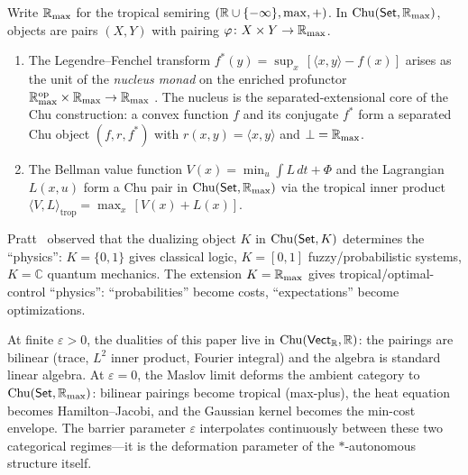 \begin{proposition}
\label{prop:tropical-chu}
Write $\mathbb{R}_{\max}$ for the tropical semiring
$(\mathbb{R} \cup \{-\infty\}, \max, +)$.
In $\mathrm{Chu}(\mathsf{Set}, \mathbb{R}_{\max})$, objects are pairs $(X, Y)$
with pairing $\varphi \colon X \times Y \to \mathbb{R}_{\max}$.
\begin{enumerate}[label=\textup{(\roman*)},nosep]
\item The Legendre--Fenchel transform
  $f^*(y) = \sup_x\, [\langle x, y \rangle - f(x)]$ arises as the
  unit of the \emph{nucleus monad} on the enriched profunctor
  $\mathbb{R}^{\operatorname{op}}_{\max} \times \mathbb{R}_{\max} \to \mathbb{R}_{\max}$
  \cite{Willerton2015}.
  The nucleus is the separated-extensional core of the Chu
  construction: a convex function $f$ and its conjugate $f^*$ form a
  separated Chu object $(f, r, f^*)$ with
  $r(x, y) = \langle x, y \rangle$ and
  $\bot = \mathbb{R}_{\max}$.
\item The Bellman value function $V(x) = \min_u \int L\, dt + \Phi$
  and the Lagrangian $L(x, u)$ form a Chu pair in
  $\mathrm{Chu}(\mathsf{Set}, \mathbb{R}_{\max})$ via the tropical inner product
  $\langle V, L \rangle_{\mathrm{trop}} = \max_x\,[V(x) + L(x)]$.
\end{enumerate}
\end{proposition}

Pratt~\cite{Pratt1995} observed that the dualizing object $K$ in
$\mathrm{Chu}(\mathsf{Set}, K)$ determines the ``physics'':
$K = \{0,1\}$ gives classical logic,
$K = [0,1]$ fuzzy/probabilistic systems,
$K = \mathbb{C}$ quantum mechanics.
The extension $K = \mathbb{R}_{\max}$ gives tropical/optimal-control
``physics'': ``probabilities'' become costs, ``expectations''
become optimizations.

\begin{remark}
\label{rmk:eps-interpolation}
At finite $\varepsilon > 0$, the dualities of this paper live in
$\mathrm{Chu}(\mathsf{Vect}_{\mathbb{R}}, \mathbb{R})$: the pairings are bilinear (trace,
$L^2$ inner product, Fourier integral) and the algebra is standard
linear algebra.
At $\varepsilon = 0$, the Maslov limit deforms the ambient category to
$\mathrm{Chu}(\mathsf{Set}, \mathbb{R}_{\max})$: bilinear pairings become tropical
(max-plus), the heat equation becomes Hamilton--Jacobi, and the
Gaussian kernel becomes the min-cost envelope.
The barrier parameter $\varepsilon$ interpolates continuously between
these two categorical regimes---it is the deformation parameter of the
$*$-autonomous structure itself.
\end{remark}

